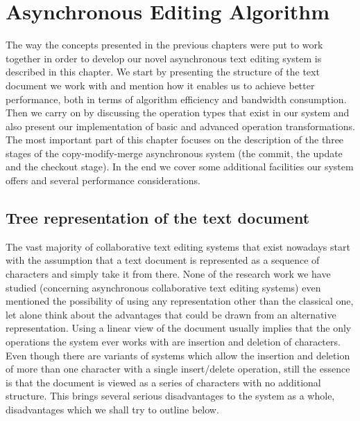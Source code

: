 \chapter{Asynchronous Editing Algorithm}
\label{chap:algorithm}

The way the concepts presented in the previous chapters were put to work together in order
to develop our novel asynchronous text editing system is described in this chapter. We
start by presenting the structure of the text document we work with and mention how it
enables us to achieve better performance, both in terms of algorithm efficiency and bandwidth
consumption. Then we carry on by discussing the operation types that exist in our system and
also present our implementation of basic and advanced operation transformations. The most
important part of this chapter focuses on the description of the three stages of the
copy-modify-merge asynchronous system (the commit, the update and the checkout stage).
In the end we cover some additional facilities our system offers and several performance
considerations.

\section{Tree representation of the text document}

The vast majority of collaborative text editing systems that exist nowadays start with
the assumption that a text document is represented as a sequence of characters and
simply take it from there. None of the research work we have studied (concerning
asynchronous collaborative text editing systems) even mentioned
the possibility of using any representation other than the classical one, let alone
think about the advantages that could be drawn from an alternative representation.
Using a linear view of the document usually implies that the only operations the system
ever works with are insertion and deletion of characters. Even though there are variants
of systems which allow the insertion and deletion of more than one character with a
single insert/delete operation, still the essence is that the document is viewed as
a series of characters with no additional structure. This brings several serious
disadvantages to the system as a whole, disadvantages which we shall try to outline below.

